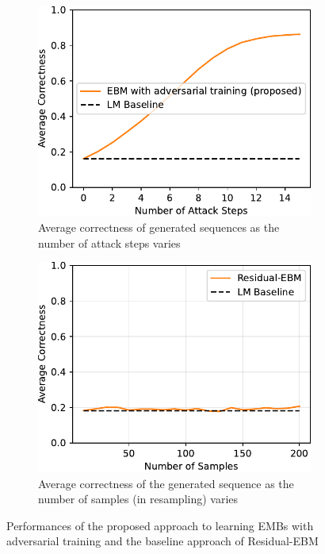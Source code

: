 \documentclass[11pt]{article}
\begin{document}
\begin{figure}[h!]
  \centering
  \begin{subfigure}[b]{0.49\textwidth}
    \includegraphics[width=\textwidth]{adv-ebm}
    \caption{Average correctness of generated sequences as the number of attack steps varies}
    \label{fig:compare_a}
  \end{subfigure}
  \hfill %
  \begin{subfigure}[b]{0.49\textwidth}
    \includegraphics[width=\textwidth]{residualEBM.pdf}
    \caption{Average correctness of the generated sequence as the number of samples (in resampling) varies}
    \label{fig:compare_b}
  \end{subfigure}
  \caption{Performances of the proposed approach to learning EMBs with adversarial training and the baseline approach of Residual-EBM}
  \label{fig:compare}
\end{figure}
\end{document}

